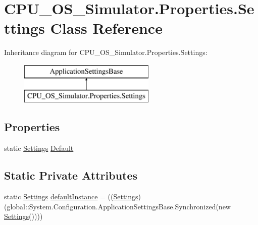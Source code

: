 \hypertarget{class_c_p_u___o_s___simulator_1_1_properties_1_1_settings}{}\section{C\+P\+U\+\_\+\+O\+S\+\_\+\+Simulator.\+Properties.\+Settings Class Reference}
\label{class_c_p_u___o_s___simulator_1_1_properties_1_1_settings}
Inheritance diagram for C\+P\+U\+\_\+\+O\+S\+\_\+\+Simulator.\+Properties.\+Settings\+:\begin{figure}[H]
\begin{center}
\leavevmode
\includegraphics[height=2.000000cm]{class_c_p_u___o_s___simulator_1_1_properties_1_1_settings}
\end{center}
\end{figure}
\subsection*{Properties}
\begin{DoxyCompactItemize}
\item 
static \hyperlink{class_c_p_u___o_s___simulator_1_1_properties_1_1_settings}{Settings} \hyperlink{class_c_p_u___o_s___simulator_1_1_properties_1_1_settings_a423993327c18a4dfede5f73981018fca}{Default}
\end{DoxyCompactItemize}
\subsection*{Static Private Attributes}
\begin{DoxyCompactItemize}
\item 
static \hyperlink{class_c_p_u___o_s___simulator_1_1_properties_1_1_settings}{Settings} \hyperlink{class_c_p_u___o_s___simulator_1_1_properties_1_1_settings_a9016562ea46f792bf8dc8d3e79dd36ae}{default\+Instance} = ((\hyperlink{class_c_p_u___o_s___simulator_1_1_properties_1_1_settings}{Settings})(global\+::\+System.\+Configuration.\+Application\+Settings\+Base.\+Synchronized(new \hyperlink{class_c_p_u___o_s___simulator_1_1_properties_1_1_settings}{Settings}())))
\end{DoxyCompactItemize}


